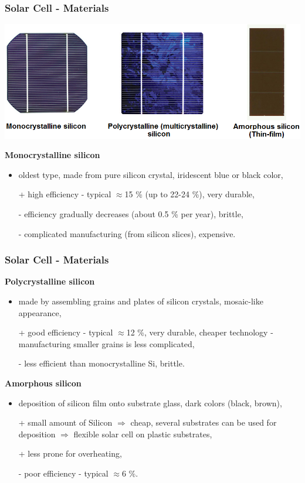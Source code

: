 \documentclass{beamer}
\begin{document}
	\begin{frame}
    \frametitle{Solar Cell - Materials}
		\begin{center}
			\includegraphics[scale=0.4]{obr05_druhy.png}
		\end{center}
		\textbf{Monocrystalline silicon}	
		\small
		\begin{itemize}
			\item oldest type, made from pure silicon crystal, iridescent blue or black color,
			\item[+] high efficiency - typical $\approx$15 \% (up to 22-24 \%), very durable,
			\item[-] efficiency gradually decreases (about 0.5 \% per year), brittle,
			\item[-] complicated manufacturing (from silicon slices), expensive. 
		\end{itemize}
	\end{frame}
	\begin{frame}
    \frametitle{Solar Cell - Materials}
		\textbf{Polycrystalline silicon}	
		\small
		\begin{itemize}
			\item made by assembling grains and plates of silicon crystals, mosaic-like appearance,
			\item[+] good efficiency - typical $\approx$12 \%, very durable, cheaper technology - manufacturing smaller grains is less complicated,
			\item[-] less efficient than monocrystalline Si, brittle. 
		\end{itemize}
		\normalsize
		\textbf{Amorphous silicon}	
		\small
		\begin{itemize}
			\item deposition of silicon film onto substrate glass, dark colors (black, brown),
			\item[+] small amount of Silicon $\Rightarrow$ cheap, several substrates can be used for deposition $\Rightarrow$ flexible solar cell on plastic substrates,
			\item[+] less prone for overheating,
			\item[-] poor efficiency - typical $\approx$6 \%. 
		\end{itemize}
	\end{frame}
\end{document}
